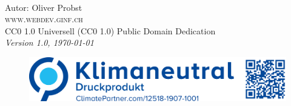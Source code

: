 
\newpage
~\vfill
\thispagestyle{empty}

\noindent Autor: Oliver Probst\\

\noindent \textsc{www.webdev.ginf.ch}\\

\noindent \ccLogo \hspace{0.1cm} \ccZero \hspace{0.1cm} CC0 1.0 Universell (CC0 1.0) Public Domain Dedication \\

\noindent \textit{Version 1.0, \today}

\begin{figure}[htb]
\includegraphics[scale=0.15]{climate}
\end{figure}
